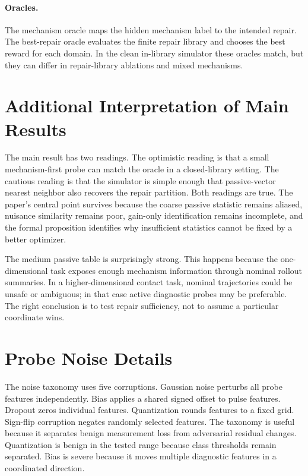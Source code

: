 \documentclass{article}
\begin{document}
\paragraph{Oracles.}
The mechanism oracle maps the hidden mechanism label to the intended repair.
The best-repair oracle evaluates the finite repair library and chooses the best
reward for each domain. In the clean in-library simulator these oracles match,
but they can differ in repair-library ablations and mixed mechanisms.

\section{Additional Interpretation of Main Results}

The main result has two readings. The optimistic reading is that a small
mechanism-first probe can match the oracle in a closed-library setting. The
cautious reading is that the simulator is simple enough that passive-vector
nearest neighbor also recovers the repair partition. Both readings are true. The
paper's central point survives because the coarse passive statistic remains
aliased, nuisance similarity remains poor, gain-only identification remains
incomplete, and the formal proposition identifies why insufficient statistics
cannot be fixed by a better optimizer.

The medium passive table is surprisingly strong. This happens because the
one-dimensional task exposes enough mechanism information through nominal
rollout summaries. In a higher-dimensional contact task, nominal trajectories
could be unsafe or ambiguous; in that case active diagnostic probes may be
preferable. The right conclusion is to test repair sufficiency, not to assume a
particular coordinate wins.

\section{Probe Noise Details}

The noise taxonomy uses five corruptions. Gaussian noise perturbs all probe
features independently. Bias applies a shared signed offset to pulse features.
Dropout zeros individual features. Quantization rounds features to a fixed grid.
Sign-flip corruption negates randomly selected features. The taxonomy is useful
because it separates benign measurement loss from adversarial residual changes.
Quantization is benign in the tested range because class thresholds remain
separated. Bias is severe because it moves multiple diagnostic features in a
coordinated direction.
\end{document}
